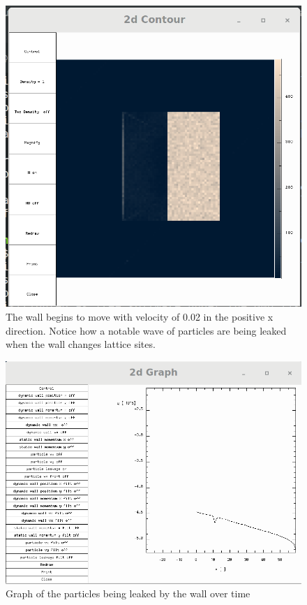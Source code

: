 \documentclass{article}
\begin{document}
\begin{figure}[H]
\includegraphics[scale=0.35]{A11p5.png}
\caption{\label{fig} The wall begins to move with velocity of 0.02 in the positive x direction. Notice how a notable wave of particles are being leaked when the wall changes lattice sites.}
\end{figure}


\begin{figure}[H]
\includegraphics[scale=0.35]{A11p3.png}
\caption{\label{fig} Graph of the particles being leaked by the wall over time}
\end{figure}
\end{document}
